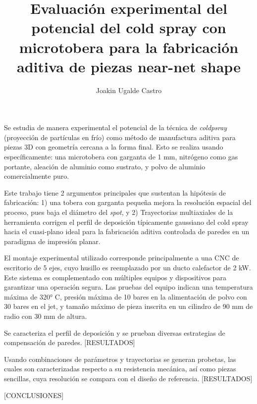 \documentclass{umemoria}
\author{Joakin Ugalde Castro}
\title{Evaluación experimental del potencial del cold spray con microtobera para la fabricación aditiva de piezas near-net shape}
\begin{document}
\frontmatter
\maketitle

\begin{resumen}

Se estudia de manera experimental el potencial de la técnica de \textit{coldpsray} (proyección de partículas en frío) como método de manufactura aditiva para piezas 3D con geometría cercana a la forma final. Esto se realiza usando específicamente: una microtobera con garganta de 1 mm, nitrógeno como gas portante, aleación de aluminio como sustrato, y polvo de aluminio comercialmente puro.

Este trabajo tiene 2 argumentos principales que sustentan la hipótesis de fabricación: 1) una tobera con garganta pequeña mejora la resolución espacial del proceso, pues baja el diámetro del \textit{spot}, y 2) Trayectorias multiaxiales de la herramienta corrigen el perfil de deposición típicamente gaussiano del cold spray hacia el cuasi-plano ideal para la fabricación aditiva controlada de paredes en un paradigma de impresión planar.

El montaje experimental utilizado corresponde principalmente a una CNC de escritorio de 5 ejes, cuyo husillo es reemplazado por un ducto calefactor de 2 kW. Este sistema es complementado con múltiples equipos y dispositivos para garantizar una operación segura. Las pruebas del equipo indican una temperatura máxima de 320° C, presión máxima de 10 bares en la alimentación de polvo con 30 bares en el jet, y tamaño máximo de pieza inscrita en un cilindro de 90 mm de radio con 30 mm de altura.

Se caracteriza el perfil de deposición y se prueban diversas estrategias de compensación de paredes. [RESULTADOS]

 Usando combinaciones de parámetros y trayectorias se generan probetas, las cuales son caracterizadas respecto a su resistencia mecánica, así como piezas sencillas, cuya resolución se compara con el diseño de referencia. [RESULTADOS]

[CONCLUSIONES]

\end{resumen}

\end{document}
